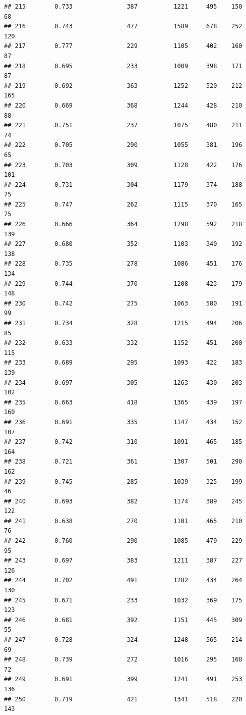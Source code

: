 \documentclass[]{book}
\begin{document}
\begin{verbatim}
## 215        0.733               387          1221     495    150     68
## 216        0.743               477          1589     678    252    120
## 217        0.777               229          1105     402    160     87
## 218        0.695               233          1009     398    171     87
## 219        0.692               363          1252     520    212    165
## 220        0.669               368          1244     428    210     88
## 221        0.751               237          1075     480    211     74
## 222        0.705               290          1055     381    196     65
## 223        0.703               309          1128     422    176    101
## 224        0.731               304          1179     374    188     75
## 225        0.747               262          1115     370    165     75
## 226        0.666               364          1298     592    218    139
## 227        0.680               352          1103     340    192    138
## 228        0.735               278          1086     451    176    134
## 229        0.744               370          1208     423    179    148
## 230        0.742               275          1063     580    191     99
## 231        0.734               328          1215     494    206     85
## 232        0.633               332          1152     451    200    115
## 233        0.689               295          1093     422    183    139
## 234        0.697               305          1263     430    203    102
## 235        0.663               418          1365     439    197    160
## 236        0.691               335          1147     434    152    107
## 237        0.742               310          1091     465    185    164
## 238        0.721               361          1307     501    290    162
## 239        0.745               285          1039     325    199     46
## 240        0.693               382          1174     389    245    122
## 241        0.638               270          1101     465    210     76
## 242        0.760               290          1085     479    229     95
## 243        0.697               383          1211     387    227    126
## 244        0.702               491          1282     434    264    130
## 245        0.671               233          1032     369    175    123
## 246        0.681               392          1151     445    309     55
## 247        0.728               324          1248     565    214     69
## 248        0.739               272          1016     295    168     72
## 249        0.691               399          1241     491    253    136
## 250        0.719               421          1341     518    220    143

\end{verbatim}
\end{document}
